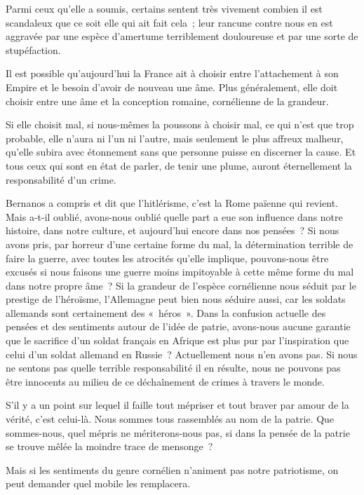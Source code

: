\documentclass[french,twoside]{book} %
\begin{document}
Parmi ceux qu'elle a soumis, certains sentent très vivement combien il est scandaleux que ce soit elle qui ait fait cela ; leur rancune contre nous en est aggravée par une espèce d'amertume terriblement douloureuse et par une sorte de stupéfaction.\par
Il est possible qu'aujourd'hui la France ait à choisir entre l'attachement à son Empire et le besoin d'avoir de nouveau une âme. Plus généralement, elle doit choisir entre une âme et la conception romaine, cornélienne de la grandeur.\par
Si elle choisit mal, si nous-mêmes la poussons à choisir mal, ce qui n'est que trop probable, elle n'aura ni l'un ni l'autre, mais seulement le plus affreux malheur, qu'elle subira avec étonnement sans que personne puisse en discerner la cause. Et tous ceux qui sont en état de parler, de tenir une plume, auront éternellement la responsabilité d'un crime.\par
Bernanos a compris et dit que l'hitlérisme, c'est la Rome païenne qui revient. Mais a-t-il oublié, avons-nous oublié quelle part a eue son influence dans notre histoire, dans notre culture, et aujourd’hui encore dans nos pensées ? Si nous avons pris, par horreur d'une certaine forme du mal, la détermination terrible de faire la guerre, avec toutes les atrocités qu'elle implique, pouvons-nous être excusés si nous faisons une guerre moins impitoyable à cette même forme du mal dans notre propre âme ? Si la grandeur de l'espèce cornélienne nous séduit par le prestige de l'héroïsme, l'Allemagne peut bien nous séduire aussi, car les soldats allemands sont certainement des « héros ». Dans la confusion actuelle des pensées et des sentiments autour de l'idée de patrie, avons-nous aucune garantie que le sacrifice d'un soldat français en Afrique est plus pur par l'inspiration que celui d'un soldat allemand en Russie ? Actuellement nous n'en avons pas. Si nous ne sentons pas quelle terrible responsabilité il en résulte, nous ne pouvons pas être innocents au milieu de ce déchaînement de crimes à travers le monde.\par
S'il y a un point sur lequel il faille tout mépriser et tout braver par amour de la vérité, c'est celui-là. Nous sommes tous rassemblés au nom de la patrie. Que sommes-nous, quel mépris ne mériterons-nous pas, si dans la pensée de la patrie se trouve mêlée la moindre trace de mensonge ?\par
Mais si les sentiments du genre cornélien n'animent pas notre patriotisme, on peut demander quel mobile les remplacera.\par
\end{document}
